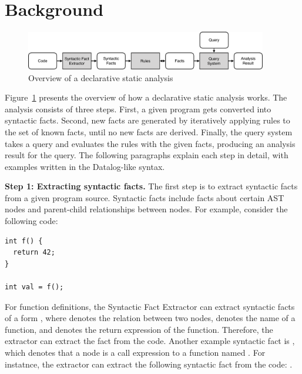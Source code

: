 \section{Background}\label{sec:background} 
\begin{figure}[t]
  \centering
  \vspace{2mm}
  \includegraphics[width=0.94\textwidth]{img/ov1.pdf}
  \caption{Overview of a declarative static analysis}
  \label{fig:ov1}
\end{figure}

Figure~\ref{fig:ov1} presents the overview of how a declarative static
analysis works.  The analysis consists of three steps.  First, a given program
gets converted into syntactic facts. 
Second, new facts are generated by iteratively applying rules to the set of
known facts, until no new facts are derived.  
Finally, the query system takes a query and evaluates the rules with the given
facts, producing an analysis result for the query. 
The following paragraphs explain each step in detail, with examples written in
the Datalog-like syntax.


\textbf{Step 1: Extracting syntactic facts.}
The first step is to extract syntactic facts from a given program source.
Syntactic facts include facts about certain AST nodes and
parent-child relationships between nodes. 
For example, consider the following code:

\begin{lstlisting}[style=mcpp]
int f() {
  return 42;
}

int val = f();
\end{lstlisting}

For function definitions, the Syntactic Fact Extractor can extract syntactic
facts of a form , where 
denotes the relation between two nodes,  denotes the name of a
function, and  denotes the return expression of the function.
Therefore, the extractor can extract the fact  from
the code.  
Another example syntactic fact is , which
denotes that a node  is a call expression to a function named
.
For instatnce, the extractor can extract the following syntactic fact from the
code: .

